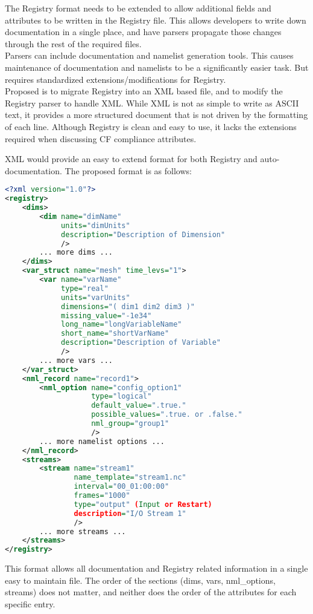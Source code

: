 \documentclass[11pt]{report}
\begin{document}
The Registry format needs to be extended to allow additional fields and
attributes to be written in the Registry file. This allows developers to write
down documentation in a single place, and have parsers propagate those changes
through the rest of the required files. \\

Parsers can include documentation and namelist generation tools. This causes
maintenance of documentation and namelists to be a significantly easier task.
But requires standardized extensions/modifications for Registry. \\


Proposed is to migrate Registry into an XML based file, and to modify the
Registry parser to handle XML. While XML is not as simple to write as ASCII
text, it provides a more structured document that is not driven by the
formatting of each line. Although Registry is clean and easy to use, it lacks
the extensions required when discussing CF compliance attributes.

XML would provide an easy to extend format for both Registry and auto-documentation. The proposed format is as follows:

{\small
\begin{lstlisting}[language=XML]
<?xml version="1.0"?>
<registry>
	<dims>
		<dim name="dimName"
			 units="dimUnits"
			 description="Description of Dimension"
			 />
		... more dims ...
	</dims>
	<var_struct name="mesh" time_levs="1">
		<var name="varName"
			 type="real"
			 units="varUnits"
			 dimensions="( dim1 dim2 dim3 )"
			 missing_value="-1e34"
			 long_name="longVariableName"
			 short_name="shortVarName"
			 description="Description of Variable"
			 />
		... more vars ...
	</var_struct>
	<nml_record name="record1">
		<nml_option name="config_option1"
					type="logical"
					default_value=".true."
					possible_values=".true. or .false."
					nml_group="group1"
					/>
		... more namelist options ...
	</nml_record>
	<streams>
		<stream name="stream1"
				name_template="stream1.nc"
				interval="00_01:00:00"
				frames="1000"
				type="output" (Input or Restart)
				description="I/O Stream 1"
				/>
		... more streams ...
	</streams>
</registry>
\end{lstlisting}
}

This format allows all documentation and Registry related information in a
single easy to maintain file. The order of the sections (dims, vars,
nml\_options, streams) does not matter, and neither does the order of the
attributes for each specific entry. \\
\end{document}
